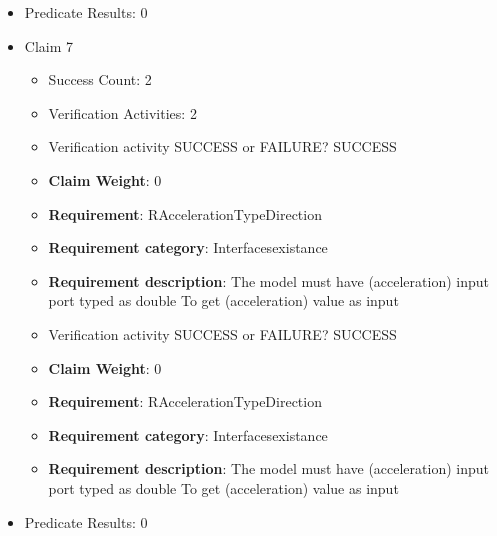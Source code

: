 \documentclass{article}
\begin{document}
\begin{itemize}
\begin{itemize}
					\item Verification activity SUCCESS or FAILURE? SUCCESS
					\item \textbf{Claim Weight}: 0
						\item \textbf{Requirement}: RSteeringAngleTypeDirection 
						\item \textbf{Requirement category}: Interfacesexistance 
						\item \textbf{Requirement description}: The model must have (steering angle) input port typed as double To get (steering angle) value as input
					
				\end{itemize}
				
									    
				\item Predicate Results: 0

  				  \item Claim 7
				\begin{itemize}
			    	\item Success Count: 2 
			    	\item Verification Activities: 2
					\item Verification activity SUCCESS or FAILURE? SUCCESS
					\item \textbf{Claim Weight}: 0
						\item \textbf{Requirement}: RAccelerationTypeDirection 
						\item \textbf{Requirement category}: Interfacesexistance 
						\item \textbf{Requirement description}: The model must have (acceleration) input port typed as double To get (acceleration) value as input
					
					\item Verification activity SUCCESS or FAILURE? SUCCESS
					\item \textbf{Claim Weight}: 0
						\item \textbf{Requirement}: RAccelerationTypeDirection 
						\item \textbf{Requirement category}: Interfacesexistance 
						\item \textbf{Requirement description}: The model must have (acceleration) input port typed as double To get (acceleration) value as input
					
				\end{itemize}
				
									    
				\item Predicate Results: 0


\end{itemize}
\end{document}
